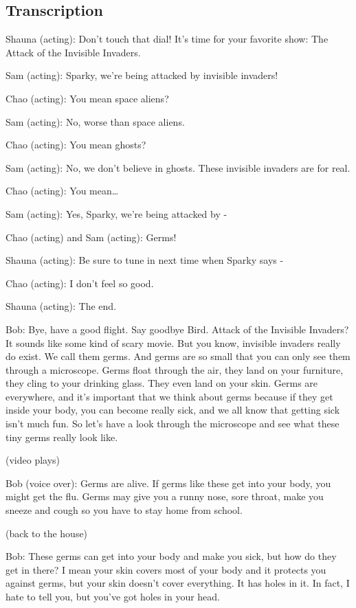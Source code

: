 \subsection{Transcription}

Shauna (acting): Don't touch that dial! It's time for your favorite show: The Attack of the Invisible Invaders.

Sam (acting): Sparky, we're being attacked by invisible invaders!

Chao (acting): You mean space aliens?

Sam (acting): No, worse than space aliens.

Chao (acting): You mean ghosts?

Sam (acting): No, we don't believe in ghosts. These invisible invaders are for real.

Chao (acting): You mean\dots

Sam (acting): Yes, Sparky, we're being attacked by -

Chao (acting) and Sam (acting): Germs!

Shauna (acting): Be sure to tune in next time when Sparky says -

Chao (acting): I don't feel so good.

Shauna (acting): The end.

Bob: Bye, have a good flight. Say goodbye Bird. Attack of the Invisible Invaders? It sounds like some kind of scary movie. But you know, invisible invaders really do exist. We call them germs. And germs are so small that you can only see them through a microscope. Germs float through the air, they land on your furniture, they cling to your drinking glass. They even land on your skin. Germs are everywhere, and it's important that we think about germs because if they get inside your body, you can become really sick, and we all know that getting sick isn't much fun. So let's have a look through the microscope and see what these tiny germs really look like.

(video plays)

Bob (voice over): Germs are alive. If germs like these get into your body, you might get the flu. Germs may give you a runny nose, sore throat, make you sneeze and cough so you have to stay home from school.

(back to the house)

Bob: These germs can get into your body and make you sick, but how do they get in there? I mean your skin covers most of your body and it protects you against germs, but your skin doesn't cover everything. It has holes in it. In fact, I hate to tell you, but you've got holes in your head.

